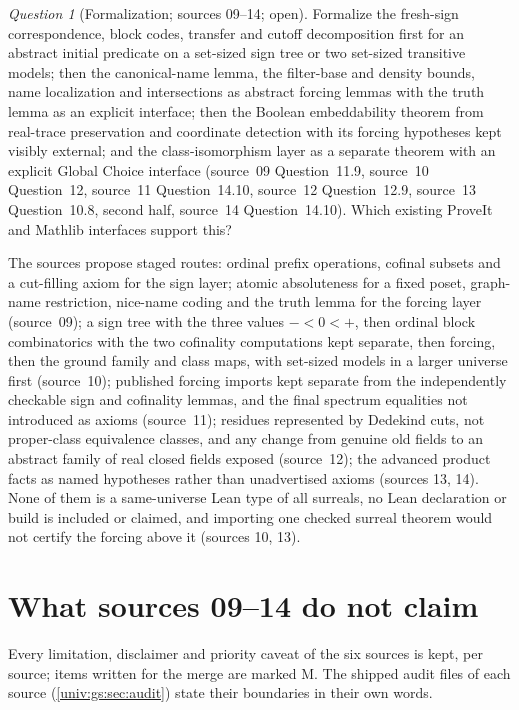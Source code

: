 \documentclass[11pt,letterpaper]{article}
\numberwithin{equation}{section}
\theoremstyle{definition}
\theoremstyle{remark}
\newtheorem{question}[question]{Question}
\begin{document}
\begin{question}[Formalization; sources 09--14; open]\label{univ:gs:q:formal}
Formalize the fresh-sign correspondence, block codes, transfer and cutoff decomposition first for an
abstract initial predicate on a set-sized sign tree or two set-sized transitive models; then the
canonical-name lemma, the filter-base and density bounds, name localization and intersections as
abstract forcing lemmas with the truth lemma as an explicit interface; then the Boolean
embeddability theorem from real-trace preservation and coordinate detection with its forcing
hypotheses kept visibly external; and the class-isomorphism layer as a separate theorem with an
explicit Global Choice interface (source~09 Question~11.9, source~10 Question~12, source~11
Question~14.10, source~12 Question~12.9, source~13 Question~10.8, second half, source~14
Question~14.10). Which existing ProveIt and Mathlib interfaces support this?
\end{question}
The sources propose staged routes: ordinal prefix operations, cofinal subsets and a cut-filling
axiom for the sign layer; atomic absoluteness for a fixed poset, graph-name restriction, nice-name
coding and the truth lemma for the forcing layer (source~09); a sign tree with the three values
$-<0<+$, then ordinal block combinatorics with the two cofinality computations kept separate, then
forcing, then the ground family and class maps, with set-sized models in a larger universe first
(source~10); published forcing imports kept separate from the independently checkable sign and
cofinality lemmas, and the final spectrum equalities not introduced as axioms (source~11); residues
represented by Dedekind cuts, not proper-class equivalence classes, and any change from genuine old
fields to an abstract family of real closed fields exposed (source~12); the advanced product facts as
named hypotheses rather than unadvertised axioms (sources 13, 14). None of them is a same-universe
Lean type of all surreals, no Lean declaration or build is included or claimed, and importing one
checked surreal theorem would not certify the forcing above it (sources 10, 13).

\section{What sources 09--14 do not claim}\label{univ:gs:sec:nonclaims}

Every limitation, disclaimer and priority caveat of the six sources is kept, per source; items
written for the merge are marked M. The shipped audit files of each source
(\cref{univ:gs:sec:audit}) state their boundaries in their own words.
\end{document}
